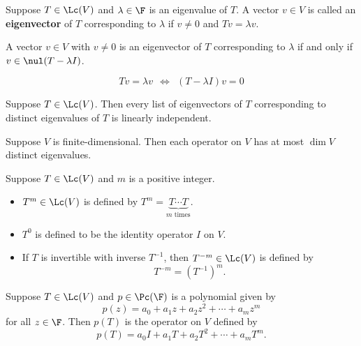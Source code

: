 \documentclass{extarticle}
\begin{document}
\begin{definition}[eigenvector]
    Suppose \(T \in \Lc(V)\) and \(\lambda \in \F\) is an eigenvalue of \(T\). A vector 
    \(v \in V\) is called an \textbf{eigenvector} of \(T\) corresponding to \(\lambda\)
    if \(v \neq 0\) and \(Tv = \lambda v\). 
\end{definition}

\begin{remark}
    A vector \(v \in V\) with \(v \neq 0\) is an eigenvector of \(T\) corresponding to \(\lambda\)
    if and only if \(v \in \nul (T - \lambda I)\). 

    \[Tv = \lambda v \ \ \Longleftrightarrow \ \ (T - \lambda I) v = 0\]
\end{remark}

\begin{lemma}
    Suppose \(T \in \Lc(V)\). Then every list of eigenvectors of \(T\) corresponding to 
    distinct eigenvalues of \(T\) is linearly independent.
\end{lemma}

\begin{thm}
    Suppose \(V\) is finite-dimensional. Then each operator on \(V\) has at most 
    \(\dim V\) distinct eigenvalues. 
\end{thm}

\begin{definition}[\(T^m\)]
    Suppose \(T \in \Lc(V)\) and \(m\) is a positive integer. 
    \begin{itemize}
        \item \(T^m \in \Lc(V)\) is defined by \(T^m = \underbrace{T\cdots T}_{m \text{ times}}\).
        \item \(T^0\) is defined to be the identity operator \(I\) on \(V\). 
        \item If \(T\) is invertible with inverse \(T^{-1}\), then \(T^{-m} \in \Lc(V)\) is defined by 
        \[T^{-m} = (T^{-1})^m.\]
    \end{itemize}
\end{definition}

\begin{definition}[\(p(T)\)]
    Suppose \(T \in \Lc(V)\) and \(p \in \Pc(\F)\) is a polynomial given by 
    \[p(z) = a_0 + a_1 z + a_2 z^2 + \cdots + a_m z^m\]
    for all \(z \in \F\). Then \(p(T)\) is the operator on \(V\) defined by 
    \[p(T) = a_0I + a_1 T + a_2 T^2 + \cdots + a_m T^m.\]
\end{definition}
\end{document}
